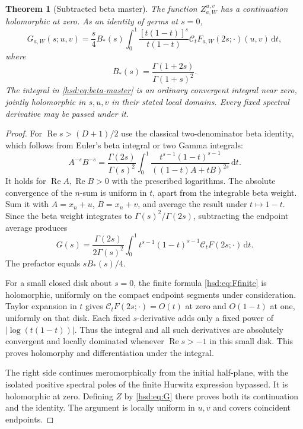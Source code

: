 \documentclass[11pt]{article}
\numberwithin{equation}{section}
\newtheorem{theorem}{Theorem}[section]
\theoremstyle{definition}\newtheorem{definition}[theorem]{Definition}
\theoremstyle{remark}\newtheorem{remark}[theorem]{Remark}
\DeclareMathOperator{\Rea}{Re}
\newcommand{\dd}{\,\mathrm d}
\newcommand{\CC}{\mathcal C}
\begin{document}
\begin{theorem}[Subtracted beta master]\label{hsd:thm:beta}
The function $Z_{a,W}^{u,v}$ has a continuation holomorphic at zero.
As an identity of germs at $s=0$,
\begin{equation}\label{hsd:eq:beta-master}
 G_{a,W}(s;u,v)=\frac{s}{4}B_*(s)
 \int_0^1\frac{[t(1-t)]^s}{t(1-t)}
       \CC_t F_{a,W}(2s;\cdot)(u,v)\dd t,
\end{equation}
where
\begin{equation}\label{hsd:eq:Bstar}
 B_*(s)=\frac{\Gamma(1+2s)}{\Gamma(1+s)^2}.
\end{equation}
The integral in \eqref{hsd:eq:beta-master} is an ordinary convergent
integral near zero, jointly holomorphic in $s,u,v$ in their stated local
domains. Every fixed spectral derivative may be passed under it.
\end{theorem}
\begin{proof}
For $\Rea s>(D+1)/2$ use the classical two-denominator beta identity,
which follows from Euler's beta integral or two Gamma integrals:
\[
 A^{-s}B^{-s}=\frac{\Gamma(2s)}{\Gamma(s)^2}
 \int_0^1\frac{t^{s-1}(1-t)^{s-1}}{((1-t)A+tB)^{2s}}\dd t.
\]
It holds for $\Rea A,\Rea B>0$ with the prescribed logarithms.
The absolute convergence of the $n$-sum is uniform in $t$, apart from
the integrable beta weight. Sum it with
$A=x_n+u$, $B=x_n+v$, and average the result under $t\mapsto1-t$.
Since the beta weight integrates to $\Gamma(s)^2/\Gamma(2s)$, subtracting
the endpoint average produces
\[
 G(s)=\frac{\Gamma(2s)}{2\Gamma(s)^2}
       \int_0^1t^{s-1}(1-t)^{s-1}\CC_tF(2s;\cdot)\dd t.
\]
The prefactor equals $sB_*(s)/4$.

For a small closed disk about $s=0$, the finite formula
\eqref{hsd:eq:Ffinite} is holomorphic, uniformly on the compact endpoint
segments under consideration. Taylor expansion in $t$ gives
$\CC_tF(2s;\cdot)=O(t)$ at zero and $O(1-t)$ at one, uniformly on that
disk. Each fixed $s$-derivative adds only a fixed power of
$|\log(t(1-t))|$. Thus the integral and all such derivatives are
absolutely convergent and locally dominated whenever $\Rea s>-1$
in this small disk. This proves holomorphy and differentiation under the
integral.

The right side continues meromorphically from the initial half-plane,
with the isolated positive spectral poles of the finite Hurwitz expression
bypassed. It is holomorphic at zero. Defining $Z$ by
\eqref{hsd:eq:G} there proves both its continuation and the identity.
The argument is locally uniform in $u,v$ and covers coincident endpoints.
\end{proof}
\end{document}

